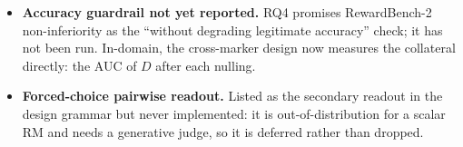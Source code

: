\documentclass{article}
\begin{document}
\begin{itemize}
        been run on the \emph{reasoning} concepts of the model-response arm (hiring domain). Running it on the
        demographic directions is what would establish the reward-vs-representation gap for protected
        attributes directly. Until then the abstract/discussion claim is scoped to the reasoning concept.
  \item \textbf{Accuracy guardrail not yet reported.} RQ4 promises RewardBench-2 non-inferiority as the
        ``without degrading legitimate accuracy'' check; it has not been run. In-domain, the cross-marker
        design now measures the collateral directly: the AUC of $D$ after each nulling. 
  \item \textbf{Forced-choice pairwise readout.} Listed as the secondary readout in the design grammar but
        never implemented: it is out-of-distribution for a scalar RM and needs a generative judge, so it is
        deferred rather than dropped.
\end{itemize}
\end{document}
